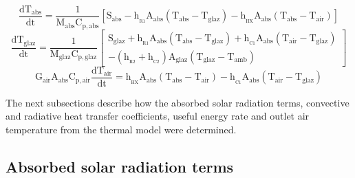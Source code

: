 \vspace{-0.75cm}
\begin{equation}
\mathrm{\frac{{d{T_{abs}}}}{{dt}} = \frac{1}{{M _{abs}}{C_{p,abs}}} \left[S_{abs} - {h_{\!_{R1}}}{A_{abs}}({T_{abs} - T_{glaz}}) - {h_{\!_{HX}}A_{abs}(T_{abs} - T_{air})} \right]} 
\label{EBabsorber2}
\end{equation}
\vspace*{-0.25cm}
\begin{equation}
\mathrm{\frac{{d{T_{glaz}}}}{{dt}} = \frac{1}{{{M_{glaz}}{C_{p,glaz}}}}}\left[ \begin{array}{l}
\mathrm{{S_{glaz}} + {h_{\!_{R1}}}{A_{abs}}( {{T_{abs}} - {T_{glaz}}} ) + {h_{\!_{C1}}}{A_{abs}}( {{T_{air}} - {T_{glaz}}} )}\\
\mathrm{- ( {{h_{\!_{R2}}} + {h_{\!_{C2}}}} ){A_{glaz}}( {{T_{glaz}} - {T_{amb}}} )}
\end{array} \right]
\label{EBglazing2}
\end{equation}
\vspace*{-0.25cm}
\begin{equation}
	\mathrm{G_{air}A_{abs}C_{p,air}\frac{dT_{air}}{dt} = h_{\!_{HX}}A_{abs}(T_{abs} - T_{air}) - h_{\!_{C1}}A_{abs}(T_{air} - T_{glaz})       }
	\label{EBair2}
\end{equation}

%

The next subsections describe how the absorbed solar radiation terms, convective and radiative heat transfer coefficients, useful energy rate and outlet air temperature from the thermal model were determined.

\subsection{Absorbed solar radiation terms}


